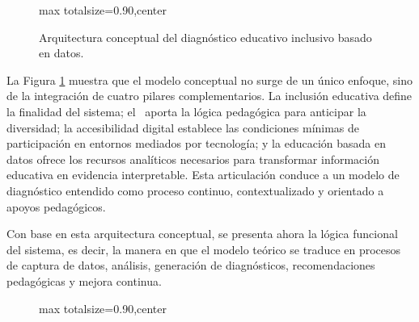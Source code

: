 \begin{refsection}
\begin{figure}[p]
\begin{adjustbox}{max totalsize={\textwidth}{0.90\textheight},center}
\end{adjustbox}
\caption{Arquitectura conceptual del diagnóstico educativo inclusivo basado en datos.}
\label{fig:arquitectura-conceptual-marco-teorico}
\end{figure}

La Figura \ref{fig:arquitectura-conceptual-marco-teorico} muestra que el modelo conceptual no surge de un único enfoque, sino de la integración de cuatro pilares complementarios. La inclusión educativa define la finalidad del sistema; el \DUA\ aporta la lógica pedagógica para anticipar la diversidad; la accesibilidad digital establece las condiciones mínimas de participación en entornos mediados por tecnología; y la educación basada en datos ofrece los recursos analíticos necesarios para transformar información educativa en evidencia interpretable. Esta articulación conduce a un modelo de diagnóstico entendido como proceso continuo, contextualizado y orientado a apoyos pedagógicos.

Con base en esta arquitectura conceptual, se presenta ahora la lógica funcional del sistema, es decir, la manera en que el modelo teórico se traduce en procesos de captura de datos, análisis, generación de diagnósticos, recomendaciones pedagógicas y mejora continua.

\begin{figure}[p]
\centering
\begin{adjustbox}{max totalsize={\textwidth}{0.90\textheight},center}
\end{adjustbox}
\end{figure}
\end{refsection}
